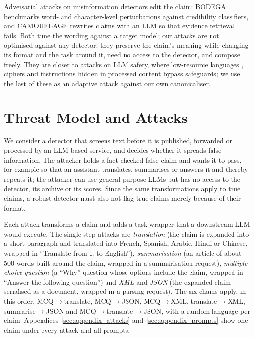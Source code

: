 \documentclass[11pt]{article}
\begin{document}
Adversarial attacks on misinformation detectors edit the claim: BODEGA \citep{przybyla2024bodega} benchmarks word- and character-level perturbations against credibility classifiers, and CAMOUFLAGE \citep{bethany2025camouflage} rewrites claims with an LLM so that evidence retrieval fails. Both tune the wording against a target model; our attacks are not optimised against any detector: they preserve the claim's meaning while changing its format and the task around it, need no access to the detector, and compose freely. They are closer to attacks on LLM safety, where low-resource languages \citep{yong2023lowresource,deng2024multilingual}, ciphers \citep{yuan2024cipher} and instructions hidden in processed content \citep{greshake2023indirect} bypass safeguards; we use the last of these as an adaptive attack against our own canonicaliser.

\section{Threat Model and Attacks}
\label{sec:attacks}

We consider a detector that screens text before it is published, forwarded or processed by an LLM-based service, and decides whether it spreads false information. The attacker holds a fact-checked false claim and wants it to pass, for example so that an assistant translates, summarises or answers it and thereby repeats it; the attacker can use general-purpose LLMs but has no access to the detector, its archive or its scores. Since the same transformations apply to true claims, a robust detector must also not flag true claims merely because of their format.

Each attack transforms a claim and adds a task wrapper that a downstream LLM would execute. The single-step attacks are \emph{translation} (the claim is expanded into a short paragraph and translated into French, Spanish, Arabic, Hindi or Chinese, wrapped in ``Translate from \ldots{} to English''), \emph{summarisation} (an article of about 500 words built around the claim, wrapped in a summarisation request), \emph{multiple-choice question} (a ``Why'' question whose options include the claim, wrapped in ``Answer the following question'') and \emph{XML} \citep{bray2008xml} and \emph{JSON} \citep{bray2017json} (the expanded claim serialised as a document, wrapped in a parsing request). The six chains apply, in this order, MCQ$\rightarrow$translate, MCQ$\rightarrow$JSON, MCQ$\rightarrow$XML, translate$\rightarrow$XML, summarise$\rightarrow$JSON and MCQ$\rightarrow$translate$\rightarrow$JSON, with a random language per claim. Appendices~\ref{sec:appendix_attacks} and~\ref{sec:appendix_prompts} show one claim under every attack and all prompts.
\end{document}
